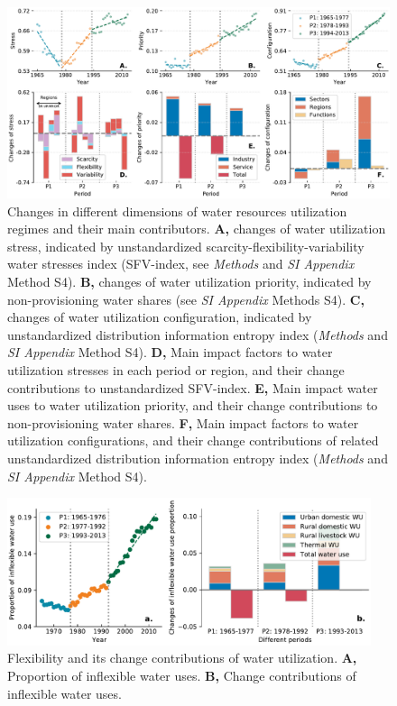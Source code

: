 \documentclass[9pt,twoside,lineno]{pnas-new}
\begin{document}
\begin{figure}
	\centering
	\includegraphics[width=\linewidth]{../../figures/main/dimensions.pdf}
	\caption{
		Changes in different dimensions of water resources utilization regimes and their main contributors.
		\textbf{A,} changes of water utilization stress, indicated by unstandardized scarcity-flexibility-variability water stresses index (SFV-index, see \textit{Methods} and \textit{SI Appendix} Method S4).
		\textbf{B,} changes of water utilization priority, indicated by non-provisioning water shares (see \textit{SI Appendix} Methods S4).
		\textbf{C,} changes of water utilization configuration, indicated by unstandardized distribution information entropy index (\textit{Methods} and \textit{SI Appendix} Method S4).
		\textbf{D,} Main impact factors to water utilization stresses in each period or region, and their change contributions to unstandardized SFV-index.
		\textbf{E,} Main impact water uses to water utilization priority, and their change contributions to non-provisioning water shares.
		\textbf{F,} Main impact factors to water utilization configurations, and their change contributions of related unstandardized distribution information entropy index (\textit{Methods} and \textit{SI Appendix} Method S4).
		}
	\label{fig:dimensions}
\end{figure}


\begin{figure}
    \centering
    \includegraphics[width=0.95\textwidth]{../../figures/sup/inflexible_wu.pdf}
    \caption{
        Flexibility and its change contributions of water utilization.
        \textbf{A,} Proportion of inflexible water uses.
        \textbf{B,} Change contributions of inflexible water uses.
    }
\end{figure}
    
\end{document}
